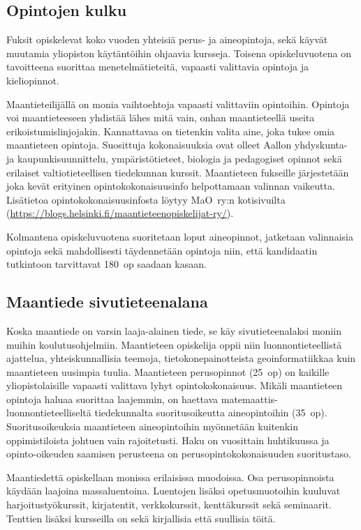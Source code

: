 \documentclass[../ala_hataile.tex]{subfiles}
\begin{document}
\subsection*{Opintojen kulku}
Fuksit opiskelevat 
koko vuoden yhteisiä perus- ja aineopintoja, sekä käyvät muutamia yliopiston käytäntöihin ohjaavia kursseja. 
Toisena opiskeluvuotena on tavoitteena
suorittaa menetelmätieteitä, vapaasti valittavia opintoja ja kieliopinnot.

Maantieteilijällä on monia vaihtoehtoja vapaasti valittaviin opintoihin.
Opintoja voi
maantieteeseen yhdistää lähes mitä
vain, onhan maantieteellä useita
erikoistumislinjojakin. Kannattavaa
on tietenkin valita aine, joka tukee
omia maantieteen opintoja. Suosittuja
kokonaisuuksia ovat olleet Aallon
yhdyskunta- ja kaupunkisuunnittelu,
ympäristötieteet, biologia ja
pedagogiset opinnot sekä erilaiset
valtiotieteellisen tiedekunnan kurssit.
Maantieteen fukseille järjestetään joka
kevät erityinen opintokokonaisuusinfo helpottamaan
valinnan vaikeutta. Lisätietoa
opintokokonaisuusinfosta löytyy MaO~ry:n kotisivuilta
(\url{https://blogs.helsinki.fi/maantieteenopiskelijat-ry/}).

Kolmantena opiskeluvuotena
suoritetaan loput aineopinnot, jatketaan valinnaisia opintoja sekä mahdollisesti
täydennetään opintoja niin, että kandidaatin
tutkintoon tarvittavat 180~op
saadaan kasaan.

\subsection*{Maantiede sivutieteenalana}
Koska maantiede on varsin laaja-alainen
tiede, se käy sivu\-tieteen\-alaksi moniin
muihin koulutusohjelmiin. Maantieteen opiskelija oppii niin luonnontieteellistä
ajattelua, yhteiskunnallisia
teemoja, tietokonepainotteista geoinformatiikkaa
kuin maantieteen uusimpia
tuulia. Maantieteen perusopinnot (25~op) on kaikille yliopistolaisille vapaasti valittava lyhyt opintokokonaisuus. Mikäli
maantieteen opintoja haluaa suorittaa
laajemmin, on haettava matemaattis-luonnontieteelliseltä
tiedekunnalta suoritusoikeutta
aineopintoihin (35~op).
Suoritusoikeuksia maantieteen aineopintoihin
myönnetään kuitenkin
oppimistiloista johtuen vain rajoitetusti.
Haku on vuosittain huhtikuussa
ja opinto-oikeuden saamisen perusteena
on perusopintokokonaisuuden
suoritustaso.

Maantiedettä opiskellaan monissa
erilaisissa muodoissa. Osa perusopinnoista
käydään laajoina massaluentoina.
Luentojen lisäksi opetusmuotoihin
kuuluvat harjoitustyökurssit, kirjatentit,
verkkokurssit, kenttäkurssit sekä seminaarit.
Tenttien lisäksi kursseilla on
sekä kirjallisia että suullisia töitä.
\end{document}
